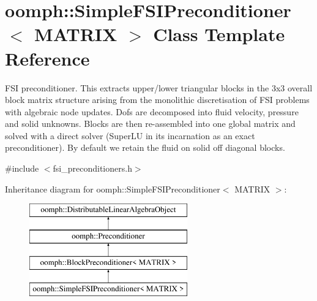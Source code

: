 \hypertarget{classoomph_1_1SimpleFSIPreconditioner}{}\section{oomph\+:\+:Simple\+F\+S\+I\+Preconditioner$<$ M\+A\+T\+R\+IX $>$ Class Template Reference}
\label{classoomph_1_1SimpleFSIPreconditioner}


F\+SI preconditioner. This extracts upper/lower triangular blocks in the 3x3 overall block matrix structure arising from the monolithic discretisation of F\+SI problems with algebraic node updates. Dofs are decomposed into fluid velocity, pressure and solid unknowns. Blocks are then re-\/assembled into one global matrix and solved with a direct solver (Super\+LU in its incarnation as an exact preconditioner). By default we retain the fluid on solid off diagonal blocks.  




{\ttfamily \#include $<$fsi\+\_\+preconditioners.\+h$>$}

Inheritance diagram for oomph\+:\+:Simple\+F\+S\+I\+Preconditioner$<$ M\+A\+T\+R\+IX $>$\+:\begin{figure}[H]
\begin{center}
\leavevmode
\includegraphics[height=4.000000cm]{classoomph_1_1SimpleFSIPreconditioner}
\end{center}
\end{figure}

